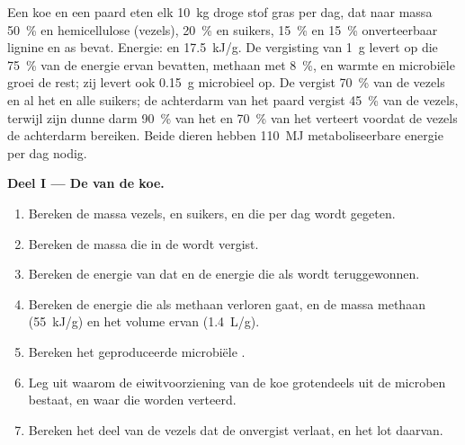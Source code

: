 \begin{problem}
\label{pb:b1:digestion-absorption:1}
Een koe en een paard eten elk \qty{10}{kg} droge stof gras per dag, dat naar
massa \qty{50}{\%}  en hemicellulose (vezels), \qty{20}{\%}
 en suikers, \qty{15}{\%}  en \qty{15}{\%} onverteerbaar
lignine en as bevat. Energie:  en  \qty{17.5}{kJ/g}. De
vergisting van \qty{1}{g}  levert  op die
\qty{75}{\%} van de energie ervan bevatten, methaan met \qty{8}{\%}, en
warmte en microbiële groei de rest; zij levert ook \qty{0.15}{g}
microbieel  op. De  vergist \qty{70}{\%} van de vezels en al het
 en alle suikers; de achterdarm van het paard vergist \qty{45}{\%}
van de vezels, terwijl zijn dunne darm \qty{90}{\%} van het  en
\qty{70}{\%} van het  verteert voordat de vezels de achterdarm
bereiken. Beide dieren hebben \qty{110}{MJ} metaboliseerbare energie per
dag nodig.

\medskip
\noindent\textbf{Deel I --- De  van de koe.}
\begin{enumerate}
  \item Bereken de massa vezels,  en suikers, en  die per
        dag wordt gegeten.
  \item Bereken de massa  die in de  wordt vergist.
  \item Bereken de energie van dat  en de energie die als
         wordt teruggewonnen.
  \item Bereken de energie die als methaan verloren gaat, en de massa
        methaan (\qty{55}{kJ/g}) en het volume ervan (\qty{1.4}{L/g}).
  \item Bereken het geproduceerde microbiële .
  \item Leg uit waarom de eiwitvoorziening van de koe grotendeels uit de
        microben bestaat, en waar die worden verteerd.
  \item Bereken het deel van de vezels dat de  onvergist verlaat, en
        het lot daarvan.
\end{enumerate}


\end{problem}
